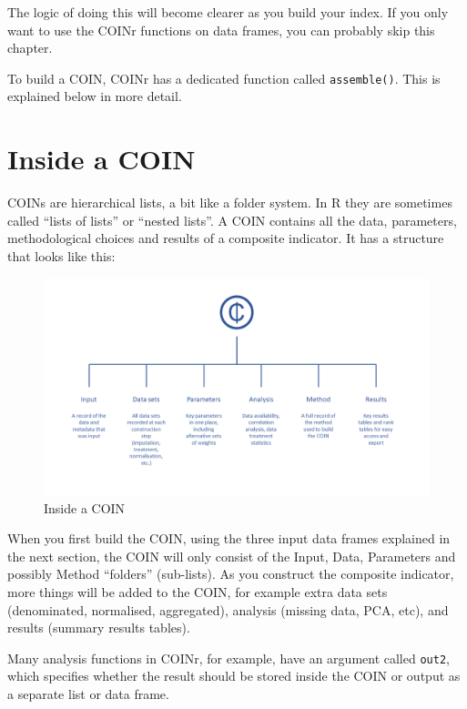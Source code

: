 \documentclass[
]{book}
\begin{document}
The logic of doing this will become clearer as you build your index. If you only want to use the COINr functions on data frames, you can probably skip this chapter.

To build a COIN, COINr has a dedicated function called \texttt{assemble()}. This is explained below in more detail.

\hypertarget{inside-a-coin}{%
\section{Inside a COIN}\label{inside-a-coin}}

COINs are hierarchical lists, a bit like a folder system. In R they are sometimes called ``lists of lists'' or ``nested lists''. A COIN contains all the data, parameters, methodological choices and results of a composite indicator. It has a structure that looks like this:

\begin{figure}

{\centering \includegraphics[width=1\linewidth]{images/COIN_contents_tree} 

}

\caption{Inside a COIN}\label{fig:unnamed-chunk-7}
\end{figure}

When you first build the COIN, using the three input data frames explained in the next section, the COIN will only consist of the Input, Data, Parameters and possibly Method ``folders'' (sub-lists). As you construct the composite indicator, more things will be added to the COIN, for example extra data sets (denominated, normalised, aggregated), analysis (missing data, PCA, etc), and results (summary results tables).

Many analysis functions in COINr, for example, have an argument called \texttt{out2}, which specifies whether the result should be stored inside the COIN or output as a separate list or data frame.
\end{document}
